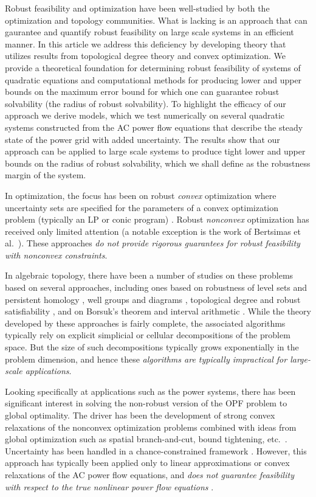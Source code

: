 \documentclass[11pt]{article}
\theoremstyle{plain}
\theoremstyle{definition}
\theoremstyle{remark}
\begin{document}
Robust feasibility and optimization have been well-studied by both the optimization and topology communities. 
What is lacking is an approach that can gaurantee and quantify robust feasibility on large scale systems in an efficient manner. 
In this article we address this deficiency by developing theory that utilizes results from topological degree theory and convex optimization. 
We provide a theoretical foundation for determining robust feasibility of systems of quadratic equations and computational methods for producing lower and upper bounds on the maximum error bound for which one can guarantee robust solvability (the radius of robust solvability). 
To highlight the efficacy of our approach we derive models, which we test numerically on several quadratic systems constructed from the AC power flow equations that describe the steady state of the power grid with added uncertainty. 
The results show that our approach can be applied to large scale systems to produce tight lower and upper bounds on the radius of robust solvability, which we shall define as the robustness margin of the system.

In optimization, the focus has been on robust \emph{convex} optimization where uncertainty sets are specified for the parameters of a convex optimization problem (typically an LP or conic program) \cite{ben2009robust}.
Robust \emph{nonconvex} optimization has received only limited attention (a notable exception is the work of Bertsimas et al.~\cite{BeNoTe2010}).
These approaches {\em do not provide rigorous guarantees for robust feasibility with nonconvex constraints}.

In algebraic topology, there have been a number of studies on these problems based on several approaches, including ones based on robustness of level sets and persistent homology \cite{BeEdMoPa2010,EdMoPa2011}, well groups and diagrams \cite{ChSkPa2012,FrKr2016well,FrKr2016pers}, topological degree and robust satisfiability \cite{FrKr2015,FrKrWa2016},  and on Borsuk's theorem and interval arithmetic \cite{FrRa2015,FrHoLa2007,FrLa2005}.
While the theory developed by these approaches is fairly complete, the associated algorithms typically rely on explicit simplicial or cellular decompositions of the problem space.
But the size of such decompositions typically grows exponentially in the problem dimension, and hence these \emph{algorithms are typically impractical for large-scale applications}.

Looking specifically at applications such as the power systems, there has been significant interest in solving the non-robust version of the OPF problem to global optimality.
The driver has been the development of strong convex relaxations of the nonconvex optimization problems combined with ideas from global optimization such as spatial branch-and-cut, bound tightening, etc.~\cite{BiMu2016,coffrin2015strengthening}.
Uncertainty has been handled in a chance-constrained framework \cite{BiChHa2014,zhang2011chance}.
However, this approach has typically been applied only to linear approximations or convex relaxations of the AC power flow equations, and \emph{does not guarantee feasibility with respect to the true nonlinear power flow equations} \cite{BiChHa2014,kocuk2016strong,RoVrOlAn2015,TsBiTa2016}.
\end{document}
